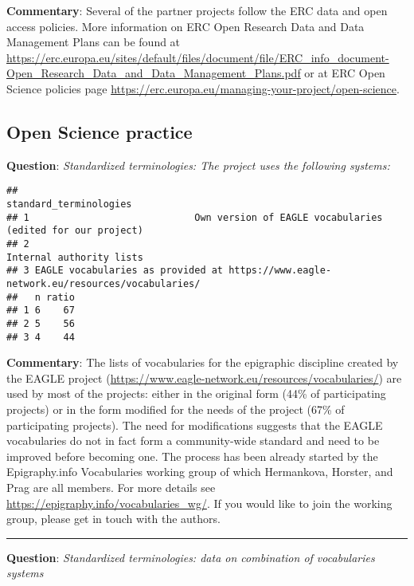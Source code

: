 \documentclass[
]{article}
\begin{document}
\textbf{Commentary}: Several of the partner projects follow the ERC data
and open access policies. More information on ERC Open Research Data and
Data Management Plans can be found at
\url{https://erc.europa.eu/sites/default/files/document/file/ERC_info_document-Open_Research_Data_and_Data_Management_Plans.pdf}
or at ERC Open Science policies page
\url{https://erc.europa.eu/managing-your-project/open-science}.

\hypertarget{open-science-practice}{%
\subsection{Open Science practice}\label{open-science-practice}}

\textbf{Question}: \emph{Standardized terminologies: The project uses
the following systems:}

\begin{verbatim}
##                                                                   standard_terminologies
## 1                             Own version of EAGLE vocabularies (edited for our project)
## 2                                                               Internal authority lists
## 3 EAGLE vocabularies as provided at https://www.eagle-network.eu/resources/vocabularies/
##   n ratio
## 1 6    67
## 2 5    56
## 3 4    44
\end{verbatim}

\textbf{Commentary}: The lists of vocabularies for the epigraphic
discipline created by the EAGLE project
(\url{https://www.eagle-network.eu/resources/vocabularies/}) are used by
most of the projects: either in the original form (44\% of participating
projects) or in the form modified for the needs of the project (67\% of
participating projects). The need for modifications suggests that the
EAGLE vocabularies do not in fact form a community-wide standard and
need to be improved before becoming one. The process has been already
started by the Epigraphy.info Vocabularies working group of which
Hermankova, Horster, and Prag are all members. For more details see
\url{https://epigraphy.info/vocabularies_wg/}. If you would like to join
the working group, please get in touch with the authors.

\begin{center}\rule{0.5\linewidth}{0.5pt}\end{center}

\textbf{Question}: \emph{Standardized terminologies: data on combination
of vocabularies systems}
\end{document}
